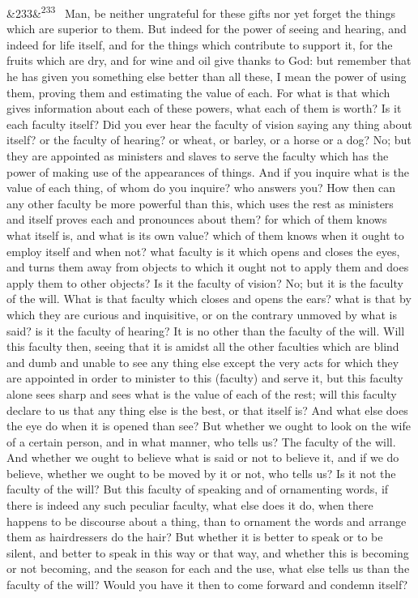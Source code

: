 \documentclass[12pt]{article}
\newcommand{\para}[1][]{\par\noindent\ifx&#1&\else\textsuperscript{\footnotesize #1}~\fi}
\begin{document}
\para[233] Man, be neither ungrateful for these gifts nor yet forget the things which are superior to them. But indeed for the power of seeing and hearing, and indeed for life itself, and for the things which contribute to support it, for the fruits which are dry, and for wine and oil give thanks to God: but remember that he has given you something else better than all these, I mean the power of using them, proving them and estimating the value of each. For what is that which gives information about each of these powers, what each of them is worth? Is it each faculty itself? Did you ever hear the faculty of vision saying any thing about itself? or the faculty of hearing? or wheat, or barley, or a horse or a dog? No; but they are appointed as ministers and slaves to serve the faculty which has the power of making use of the appearances of things. And if you inquire what is the value of each thing, of whom do you inquire? who answers you? How then can any other faculty be more powerful than this, which uses the rest as ministers and itself proves each and pronounces about them? for which of them knows what itself is, and what is its own value? which of them knows when it ought to employ itself and when not? what faculty is it which opens and closes the eyes, and turns them away from objects to which it ought not to apply them and does apply them to other objects? Is it the faculty of vision? No; but it is the faculty of the will. What is that faculty which closes and opens the ears? what is that by which they are curious and inquisitive, or on the contrary unmoved by what is said? is it the faculty of hearing? It is no other than the faculty of the will. Will this faculty then, seeing that it is amidst all the other faculties which are blind and dumb and unable to see any thing else except the very acts for which they are appointed in order to minister to this (faculty) and serve it, but this faculty alone sees sharp and sees what is the value of each of the rest; will this faculty declare to us that any thing else is the best, or that itself is? And what else does the eye do when it is opened than see? But whether we ought to look on the wife of a certain person, and in what manner, who tells us? The faculty of the will. And whether we ought to believe what is said or not to believe it, and if we do believe, whether we ought to be moved by it or not, who tells us? Is it not the faculty of the will? But this faculty of speaking and of ornamenting words, if there is indeed any such peculiar faculty, what else does it do, when there happens to be discourse about a thing, than to ornament the words and arrange them as hairdressers do the hair? But whether it is better to speak or to be silent, and better to speak in this way or that way, and whether this is becoming or not becoming, and the season for each and the use, what else tells us than the faculty of the will? Would you have it then to come forward and condemn itself?
\end{document}
